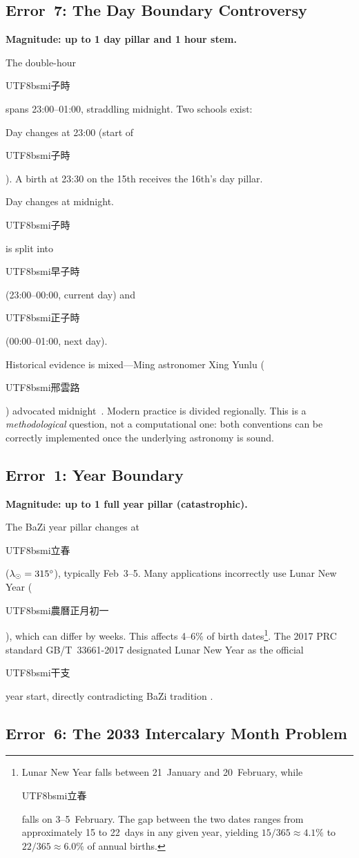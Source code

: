 \documentclass[10pt,a4paper]{article}
\newcommand{\zh}[1]{\begin{CJK}{UTF8}{bsmi}#1\end{CJK}}
\begin{document}
\subsection{Error~7: The Day Boundary Controversy}
\label{subsec:error_zishi}

\textbf{Magnitude: up to 1 day pillar and 1 hour stem.}

The double-hour \zh{子時} spans 23:00--01:00, straddling midnight. Two
schools exist:

\begin{description}[leftmargin=0pt]
  \item[\zh{子初換日}:] Day changes at 23:00 (start of \zh{子時}).
    A birth at 23:30 on the 15th receives the 16th's day pillar.
  \item[\zh{子正換日}:] Day changes at midnight. \zh{子時} is split
    into \zh{早子時} (23:00--00:00, current day) and \zh{正子時}
    (00:00--01:00, next day).
\end{description}

Historical evidence is mixed---Ming astronomer Xing Yunlu (\zh{邢雲路})
advocated midnight~\cite{xing_yunlu}. Modern practice is divided regionally. This is a
\emph{methodological} question, not a computational one: both conventions
can be correctly implemented once the underlying astronomy is sound.

\subsection{Error~1: Year Boundary}
\label{subsec:error_lichun}

\textbf{Magnitude: up to 1 full year pillar (catastrophic).}

The BaZi year pillar changes at \zh{立春} ($\lambda_\odot = 315\degree$),
typically Feb~3--5. Many applications incorrectly use Lunar New Year
(\zh{農曆正月初一}), which can differ by weeks. This affects 4--6\% of birth
dates\footnote{Lunar New Year falls between 21~January and 20~February,
while \zh{立春} falls on 3--5~February. The gap between the two dates
ranges from approximately 15 to 22~days in any given year, yielding
$15/365 \approx 4.1\%$ to $22/365 \approx 6.0\%$ of annual births.}. The 2017 PRC standard GB/T~33661-2017 designated Lunar New Year as the
official \zh{干支} year start, directly contradicting BaZi tradition
\cite{gbstandard2017}.

\subsection{Error~6: The 2033 Intercalary Month Problem}
\label{subsec:error_2033}
\end{document}
